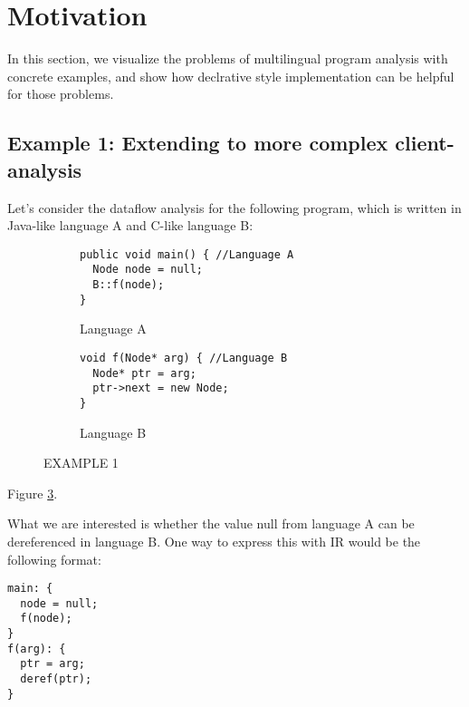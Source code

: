 \section{Motivation}

In this section, we visualize the problems of multilingual program analysis
with concrete examples, and show how declrative style implementation can be helpful
for those problems.

\subsection{Example 1: Extending to more complex client-analysis}

Let's consider the dataflow analysis for the following program,
which is written in Java-like language A and C-like language B:


\begin{figure}[t]
  \centering
  \vspace{2mm}
  \begin{subfigure}[t]{0.5\textwidth}
    \begin{lstlisting}[style=java,xleftmargin=2.5em]
public void main() { //Language A
  Node node = null;
  B::f(node);
}
    \end{lstlisting}
    \vspace*{-.5em}
    \caption{Language A}
    \label{fig:exam1:langA}
  \end{subfigure}
  \begin{subfigure}[t]{0.5\textwidth}
    \begin{lstlisting}[style=cpp,firstnumber=5,xleftmargin=2.5em]
void f(Node* arg) { //Language B
  Node* ptr = arg;
  ptr->next = new Node;
}
    \end{lstlisting}
    \vspace*{-.5em}
    \caption{Language B}
    \label{fig:exam1:langB}
  \end{subfigure}
  \vspace*{-.5em}
  \caption{EXAMPLE 1}
  \label{fig:exam1}
\end{figure}
Figure \ref{fig:exam1}.

What we are interested is whether the value null from language A
can be dereferenced in language B. One way to express this with IR 
would be the following format: 
\begin{lstlisting}[style=myIR,xleftmargin=2.5em]
main: {
  node = null;
  f(node);
}
f(arg): {
  ptr = arg;
  deref(ptr);
}
\end{lstlisting}

